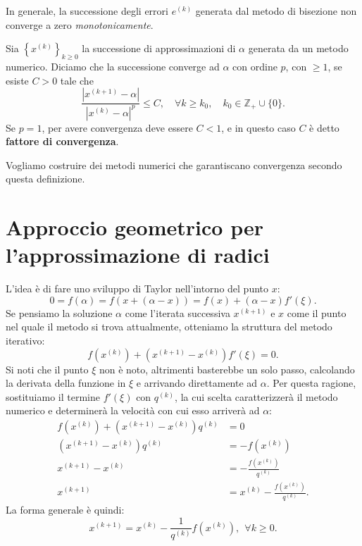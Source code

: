 In generale, la successione degli errori $e^{(k)}$ generata dal metodo di bisezione non converge a zero \textit{monotonicamente}.
\begin{definition}
Sia $\left\{x^{(k)}\right\}_{k\geqslant 0}$ la successione di approssimazioni di $\alpha $ generata da un metodo numerico. Diciamo che la successione converge ad $\alpha $ con ordine $p$, con $\geqslant 1$, se esiste $C >0$ tale che
\begin{equation*}
\frac{\left| x^{( k+1)} -\alpha \right| }{\left| x^{(k)} -\alpha \right| ^{p}} \leqslant C,\quad \forall k\geqslant k_{0} ,\quad k_{0} \in \mathbb{Z}_{+} \cup \{0\} .
\end{equation*}
Se $p=1$, per avere convergenza deve essere $C< 1$, e in questo caso $C$ è detto \textbf{fattore di convergenza}.
\end{definition}
Vogliamo costruire dei metodi numerici che garantiscano convergenza secondo questa definizione.
\section{Approccio geometrico per l'approssimazione di radici}

L'idea è di fare uno sviluppo di Taylor nell'intorno del punto $x$:
\begin{equation*}
0 =f( \alpha ) =f( x+( \alpha -x)) = f(x) +( \alpha -x) f'( \xi ).
\end{equation*}
Se pensiamo la soluzione $\alpha$ come l'iterata successiva $x^{( k+1)}$ e $x$ come il punto nel quale il metodo si trova attualmente, otteniamo la struttura del metodo iterativo:
\begin{equation*}
f\left( x^{(k)}\right) +\left( x^{( k+1)} -x^{(k)}\right) f'( \xi ) =0.
\end{equation*}
Si noti che il punto $\xi $ non è noto, altrimenti basterebbe un solo passo, calcolando la derivata della funzione in $\xi$ e arrivando direttamente ad $\alpha $.
Per questa ragione, sostituiamo il termine $f'( \xi )$ con $q^{(k)}$, la cui scelta caratterizzerà il metodo numerico e determinerà la velocità con cui esso arriverà ad $\alpha $:
\begin{equation*}
\begin{aligned}
f\left( x^{(k)}\right) +\left( x^{( k+1)} -x^{(k)}\right) q^{(k)} & =0\\
\left( x^{( k+1)} -x^{(k)}\right) q^{(k)} & =-f\left( x^{(k)}\right)\\
x^{( k+1)} -x^{(k)} & =-\frac{f\left( x^{(k)}\right)}{q^{(k)}}\\
x^{( k+1)} & =x^{(k)} -\frac{f\left( x^{(k)}\right)}{q^{(k)}}.
\end{aligned}
\end{equation*}
La forma generale è quindi:
\begin{equation}
x^{( k+1)} =x^{(k)} -\frac{1}{q^{(k)}} f\left( x^{(k)}\right) ,\ \ \forall k\geqslant 0.
\label{eq:forma-generale-non-lineari}
\end{equation}

